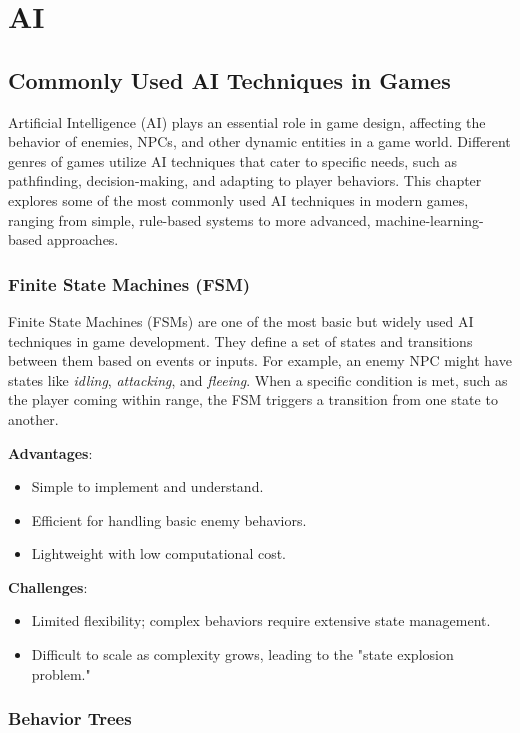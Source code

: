 \section{AI}
\subsection{Commonly Used AI Techniques in Games}

Artificial Intelligence (AI) plays an essential role in game design, affecting the behavior of enemies, NPCs, and other dynamic entities in a game world. Different genres of games utilize AI techniques that cater to specific needs, such as pathfinding, decision-making, and adapting to player behaviors. This chapter explores some of the most commonly used AI techniques in modern games, ranging from simple, rule-based systems to more advanced, machine-learning-based approaches.

\subsubsection{Finite State Machines (FSM)}

Finite State Machines (FSMs) are one of the most basic but widely used AI techniques in game development. They define a set of states and transitions between them based on events or inputs. For example, an enemy NPC might have states like \textit{idling}, \textit{attacking}, and \textit{fleeing}. When a specific condition is met, such as the player coming within range, the FSM triggers a transition from one state to another.

\textbf{Advantages}:
\begin{itemize}
    \item Simple to implement and understand.
    \item Efficient for handling basic enemy behaviors.
    \item Lightweight with low computational cost.
\end{itemize}

\textbf{Challenges}:
\begin{itemize}
    \item Limited flexibility; complex behaviors require extensive state management.
    \item Difficult to scale as complexity grows, leading to the "state explosion problem." \end{itemize}

\subsubsection{Behavior Trees}

